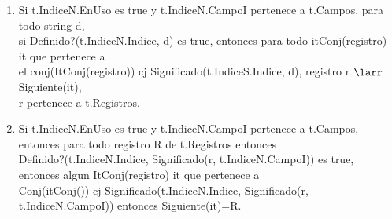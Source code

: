 \begin{enumerate}
\item	Si t.IndiceN.EnUso es true y t.IndiceN.CampoI pertenece a t.Campos, para todo string d, \\
si Definido?(t.IndiceN.Indice, d) es true, entonces para todo itConj(registro) it que pertenece a \\
el conj(ItConj(registro)) cj Significado(t.IndiceS.Indice, d), registro r $\larr$Siguiente(it), \\
r pertenece a t.Registros.
\newpage
\item	Si t.IndiceN.EnUso es true y t.IndiceN.CampoI pertenece a t.Campos, \\
entonces para todo registro R de t.Registros entonces \\
Definido?(t.IndiceN.Indice, Significado(r, t.IndiceN.CampoI)) es true, \\
entonces algun ItConj(registro) it que pertenece a \\
Conj(itConj()) cj Significado(t.IndiceN.Indice, Significado(r, t.IndiceN.CampoI)) entonces Siguiente(it)=R.



\end{enumerate}
